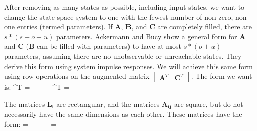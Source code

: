    After removing as many states as possible, including input
states, we want to change the state-space system to one with the
fewest number of non-zero, non-one entries (termed parameters). If
$\mathbf{A}$, $\mathbf{B}$, and $\mathbf{C}$ are completely
filled, there are $s*(s+o+u)$ parameters. Ackermann and Bucy
\cite{Ackermann/Bucy} show a general form for $\mathbf{A}$ and
$\mathbf{C}$ ($\mathbf{B}$ can be filled with parameters) to have
at most $s*(o+u)$ parameters, assuming there are no unobservable
or unreachable states. They derive this form using system impulse
responses. We will achieve this same form using row operations on
the augmented matrix $\left [
\begin{array} {cc} \mathbf{A}^T & \mathbf{C}^T \end{array} \right
]$. The form we want is:
\starteqnstar
{}^T =  ~~~~~
^T = 
\doneeqnstar

    The matrices $\mathbf{L_i}$ are rectangular, and the matrices
$\mathbf{A_{ij}}$ are square, but do not necessarily have the same
dimensions as each other. These matrices have the form:
\starteqnstar
{} =  ~~~~~
 = 
\doneeqnstar

